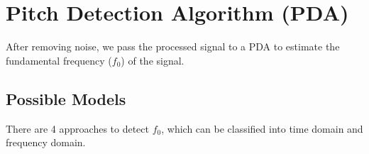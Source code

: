 \section{Pitch Detection Algorithm (PDA)}
\label{sec:PDA}
After removing noise, we pass the processed signal to a PDA to estimate the fundamental frequency ($f_0$) of
the signal.

\subsection{Possible Models}
There are 4 approaches to detect $f_0$, which can be classified into time domain and frequency domain.

